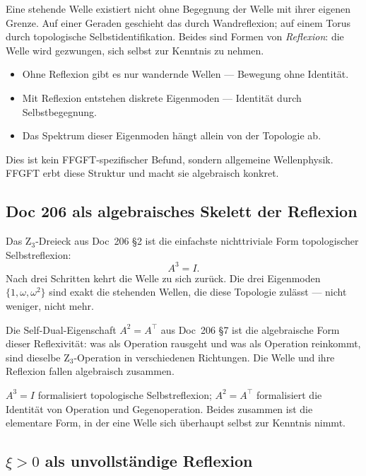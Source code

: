 Eine stehende Welle existiert nicht ohne Begegnung der Welle mit ihrer eigenen Grenze. Auf einer Geraden geschieht das durch Wandreflexion; auf einem Torus durch topologische Selbstidentifikation. Beides sind Formen von \emph{Reflexion}: die Welle wird gezwungen, sich selbst zur Kenntnis zu nehmen.

\begin{itemize}
\item Ohne Reflexion gibt es nur wandernde Wellen --- Bewegung ohne Identität.
\item Mit Reflexion entstehen diskrete Eigenmoden --- Identität durch Selbstbegegnung.
\item Das Spektrum dieser Eigenmoden hängt allein von der Topologie ab.
\end{itemize}

Dies ist kein FFGFT-spezifischer Befund, sondern allgemeine Wellenphysik. FFGFT erbt diese Struktur und macht sie algebraisch konkret.

\subsection{Doc 206 als algebraisches Skelett der Reflexion}\label{sec:reflexion_doc206}

Das Z$_3$-Dreieck aus Doc~206 \S2 ist die einfachste nichttriviale Form topologischer Selbstreflexion:
\begin{equation}
A^3 = I.
\end{equation}
Nach drei Schritten kehrt die Welle zu sich zurück. Die drei Eigenmoden $\{1, \omega, \omega^2\}$ sind exakt die stehenden Wellen, die diese Topologie zulässt --- nicht weniger, nicht mehr.

Die Self-Dual-Eigenschaft $A^2 = A^\top$ aus Doc~206 \S7 ist die algebraische Form dieser Reflexivität: was als Operation rausgeht und was als Operation reinkommt, sind dieselbe Z$_3$-Operation in verschiedenen Richtungen. Die Welle und ihre Reflexion fallen algebraisch zusammen.

\begin{insightBox}
$A^3 = I$ formalisiert topologische Selbstreflexion; $A^2 = A^\top$ formalisiert die Identität von Operation und Gegenoperation. Beides zusammen ist die elementare Form, in der eine Welle sich überhaupt \glqq selbst zur Kenntnis nimmt\grqq{}.
\end{insightBox}

\subsection{\texorpdfstring{$\xi > 0$ als unvollständige Reflexion}{xi > 0 als unvollständige Reflexion}}\label{sec:reflexion_xi}


